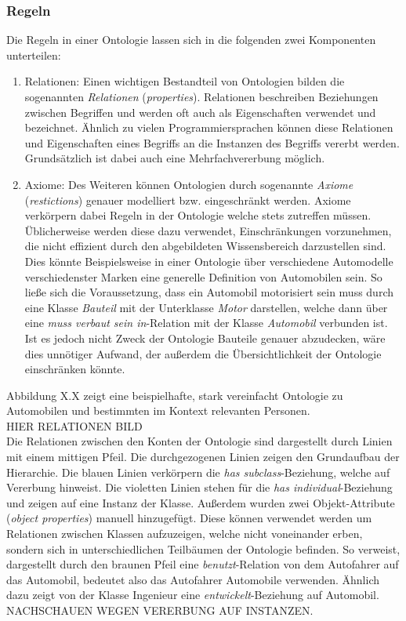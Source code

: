 \documentclass[12pt]{report}
\begin{document}
\subsubsection{Regeln}
Die Regeln in einer Ontologie lassen sich in die folgenden zwei Komponenten unterteilen:
\begin{enumerate}
\item Relationen: Einen wichtigen Bestandteil von Ontologien bilden die sogenannten \textit{Relationen} (\textit{properties}).
Relationen beschreiben Beziehungen zwischen Begriffen und werden oft auch als Eigenschaften verwendet und bezeichnet. Ähnlich zu vielen Programmiersprachen können diese Relationen und Eigenschaften eines Begriffs an die Instanzen des Begriffs vererbt werden. Grundsätzlich ist dabei auch eine Mehrfachvererbung möglich. 

\item Axiome: Des Weiteren können Ontologien durch sogenannte \textit{Axiome} (\textit{restictions})  genauer modelliert bzw. eingeschränkt werden. Axiome verkörpern dabei Regeln in der Ontologie welche stets zutreffen müssen. Üblicherweise werden diese dazu verwendet, Einschränkungen vorzunehmen, die nicht effizient durch den abgebildeten Wissensbereich darzustellen sind. Dies könnte Beispielsweise in einer Ontologie über verschiedene Automodelle verschiedenster Marken eine generelle Definition von Automobilen sein. 
So ließe sich die Voraussetzung, dass ein Automobil motorisiert sein muss durch eine Klasse \textit{Bauteil} mit der Unterklasse \textit{Motor} darstellen, welche dann über eine \textit{muss verbaut sein in}-Relation mit der Klasse \textit{Automobil} verbunden ist. Ist es jedoch nicht Zweck der Ontologie Bauteile genauer abzudecken, wäre dies unnötiger Aufwand, der außerdem die Übersichtlichkeit der Ontologie einschränken könnte.
\end{enumerate}

Abbildung X.X zeigt eine beispielhafte, stark vereinfacht Ontologie zu Automobilen und bestimmten im Kontext relevanten Personen. 
\\
\newline
HIER RELATIONEN BILD
\\
\newline
Die Relationen zwischen den Konten der Ontologie sind dargestellt durch Linien mit einem mittigen Pfeil. Die durchgezogenen Linien zeigen den Grundaufbau der Hierarchie. Die blauen Linien verkörpern die \textit{has subclass}-Beziehung, welche auf Vererbung hinweist. Die violetten Linien stehen für die \textit{has individual}-Beziehung und zeigen auf eine Instanz der Klasse. 
Außerdem wurden zwei Objekt-Attribute (\textit{object properties}) manuell hinzugefügt. Diese können verwendet werden um Relationen zwischen Klassen aufzuzeigen, welche nicht voneinander erben, sondern sich in unterschiedlichen \glqq Teilbäumen\grqq{} der Ontologie befinden. So verweist, dargestellt durch den braunen Pfeil eine \textit{benutzt}-Relation von dem Autofahrer auf das Automobil, bedeutet also das Autofahrer Automobile verwenden.  
Ähnlich dazu zeigt von der Klasse Ingenieur eine \textit{entwickelt}-Beziehung auf Automobil.
\\
\newline
NACHSCHAUEN WEGEN VERERBUNG AUF INSTANZEN.
\end{document}
